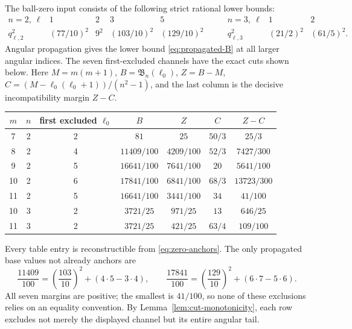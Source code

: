 \documentclass[11pt]{article}
\theoremstyle{definition}
\theoremstyle{remark}
\newcommand{\frB}{\mathfrak B}
\begin{document}
The ball-zero input consists of the following strict rational lower
bounds:
\begin{equation}
\begin{array}{c|cccc}
n=2,\ \ell&1&2&3&5\\ \hline
q_{\ell,2}^2&(77/10)^2&9^2&(103/10)^2&(129/10)^2
\end{array}
\qquad
\begin{array}{c|cc}
n=3,\ \ell&1&2\\ \hline
q_{\ell,3}^2&(21/2)^2&(61/5)^2.
\end{array}
\label{eq:zero-anchors}
\end{equation}
Angular propagation gives the lower bound \eqref{eq:propagated-B} at all
larger angular indices.  The seven first-excluded channels have the exact
cuts shown below.  Here \(M=m(m+1)\), \(B=\frB_n(\ell_0)\),
\(Z=B-M\), \(C=(M-\ell_0(\ell_0+1))/(n^2-1)\), and the last column is
the decisive incompatibility margin \(Z-C\).

\begin{center}
\small
\renewcommand{\arraystretch}{1.22}
\begin{tabular}{c|c|c|c|c|c|c}
\(m\)&\(n\)&first excluded \(\ell_0\)&\(B\)&\(Z\)&\(C\)&\(Z-C\)\\ \hline
7&2&2&\(81\)&\(25\)&\(50/3\)&\(25/3\)\\
8&2&4&\(11409/100\)&\(4209/100\)&\(52/3\)&\(7427/300\)\\
9&2&5&\(16641/100\)&\(7641/100\)&\(20\)&\(5641/100\)\\
10&2&6&\(17841/100\)&\(6841/100\)&\(68/3\)&\(13723/300\)\\
11&2&5&\(16641/100\)&\(3441/100\)&\(34\)&\(41/100\)\\
10&3&2&\(3721/25\)&\(971/25\)&\(13\)&\(646/25\)\\
11&3&2&\(3721/25\)&\(421/25\)&\(63/4\)&\(109/100\)
\end{tabular}
\end{center}

Every table entry is reconstructible from \eqref{eq:zero-anchors}.  The
only propagated base values not already anchors are
\[
 \frac{11409}{100}=\left(\frac{103}{10}\right)^2+(4\cdot5-3\cdot4),
 \qquad
 \frac{17841}{100}=\left(\frac{129}{10}\right)^2+(6\cdot7-5\cdot6).
\]
All seven margins are positive; the smallest is \(41/100\), so none of
these exclusions relies on an equality convention.  By
Lemma~\ref{lem:cut-monotonicity}, each row excludes not merely the displayed
channel but its entire angular tail.
\end{document}
